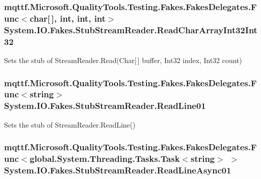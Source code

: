 \hypertarget{class_system_1_1_i_o_1_1_fakes_1_1_stub_stream_reader_abdabf0cc7d34c14489731df4bf3bc495}{
\subsubsection[{Read\-Char\-Array\-Int32\-Int32}]{\setlength{\rightskip}{0pt plus 5cm}mqttf.\-Microsoft.\-Quality\-Tools.\-Testing.\-Fakes.\-Fakes\-Delegates.\-Func$<$char\mbox{[}$\,$\mbox{]}, int, int, int$>$ System.\-I\-O.\-Fakes.\-Stub\-Stream\-Reader.\-Read\-Char\-Array\-Int32\-Int32}}\label{class_system_1_1_i_o_1_1_fakes_1_1_stub_stream_reader_abdabf0cc7d34c14489731df4bf3bc495}


Sets the stub of Stream\-Reader.\-Read(\-Char\mbox{[}$\,$\mbox{]} buffer, Int32 index, Int32 count)

\hypertarget{class_system_1_1_i_o_1_1_fakes_1_1_stub_stream_reader_a4878df0d173b5e789edeb1cf64c394a9}{
\subsubsection[{Read\-Line01}]{\setlength{\rightskip}{0pt plus 5cm}mqttf.\-Microsoft.\-Quality\-Tools.\-Testing.\-Fakes.\-Fakes\-Delegates.\-Func$<$string$>$ System.\-I\-O.\-Fakes.\-Stub\-Stream\-Reader.\-Read\-Line01}}\label{class_system_1_1_i_o_1_1_fakes_1_1_stub_stream_reader_a4878df0d173b5e789edeb1cf64c394a9}


Sets the stub of Stream\-Reader.\-Read\-Line()

\hypertarget{class_system_1_1_i_o_1_1_fakes_1_1_stub_stream_reader_a8bcea0f41583305f24da96482b9a3a06}{
\subsubsection[{Read\-Line\-Async01}]{\setlength{\rightskip}{0pt plus 5cm}mqttf.\-Microsoft.\-Quality\-Tools.\-Testing.\-Fakes.\-Fakes\-Delegates.\-Func$<$global.\-System.\-Threading.\-Tasks.\-Task$<$string$>$ $>$ System.\-I\-O.\-Fakes.\-Stub\-Stream\-Reader.\-Read\-Line\-Async01}}\label{class_system_1_1_i_o_1_1_fakes_1_1_stub_stream_reader_a8bcea0f41583305f24da96482b9a3a06}


